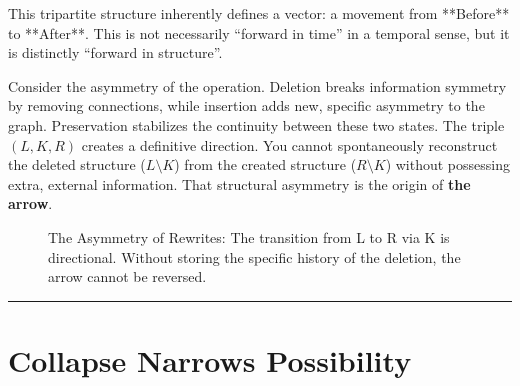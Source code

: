 This tripartite structure inherently defines a vector: a movement from **Before** to **After**. This is not necessarily ``forward in time'' in a temporal sense, but it is distinctly ``forward in structure''.

Consider the asymmetry of the operation. Deletion breaks information symmetry by removing connections, while insertion adds new, specific asymmetry to the graph. Preservation stabilizes the continuity between these two states. The triple $(L,K,R)$ creates a definitive direction. You cannot spontaneously reconstruct the deleted structure ($L \setminus K$) from the created structure ($R \setminus K$) without possessing extra, external information. That structural asymmetry is the origin of \textbf{the arrow}.

\begin{figure}[h]
\centering
{}
\caption{The Asymmetry of Rewrites: The transition from L to R via K is directional. Without storing the specific history of the deletion, the arrow cannot be reversed.}
\end{figure}

\begin{center}\rule{0.5\linewidth}{0.5pt}\end{center}

\section{\texorpdfstring{\textbf{Collapse Narrows Possibility}}{14.2 --- Collapse Narrows Possibility}}

